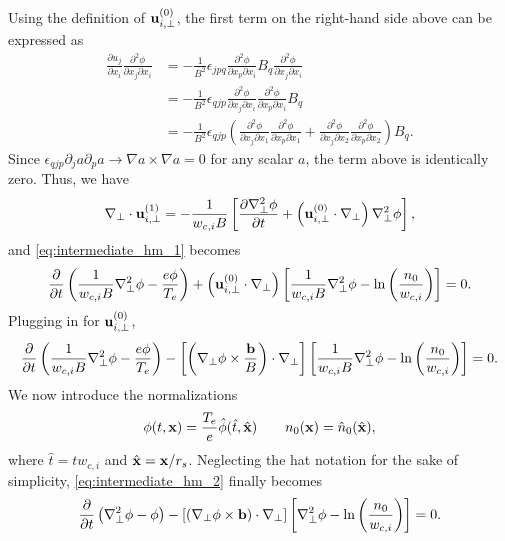 \documentclass[oneside,a4paper,11pt]{report}
\begin{document}
Using the definition of $\mathbf{u}_{i,\perp}^{(0)}$, the first term on the right-hand side above can be expressed as
\begin{align}
    \frac{\partial u_j}{\partial x_i} \frac{\partial^2 \phi}{\partial x_j \partial x_i} &= -\frac{1}{B^2} \epsilon_{jpq} \frac{\partial^2 \phi}{\partial x_p \partial x_i} B_q \frac{\partial^2 \phi}{\partial x_j \partial x_i} \nonumber \\
    &= -\frac{1}{B^2} \epsilon_{qjp} \frac{\partial^2 \phi}{\partial x_j \partial x_i} \frac{\partial^2 \phi}{\partial x_p \partial x_i} B_q  \nonumber \\
    &= -\frac{1}{B^2} \epsilon_{qjp} \left ( \frac{\partial^2 \phi}{\partial x_j \partial x_1} \frac{\partial^2 \phi}{\partial x_p \partial x_1} + \frac{\partial^2 \phi}{\partial x_j \partial x_2} \frac{\partial^2 \phi}{\partial x_p \partial x_2}  \right ) B_q.
\end{align}
Since $\epsilon_{qjp} \partial_j a \partial_p a \to \nabla a \times \nabla a = 0$ for any scalar $a$, the term above is identically zero. Thus, we have
\begin{equation}
    \nabla_\perp \cdot \mathbf{u}_{i,\perp}^{(1)} = -\frac{1}{w_{c,i} B} \left [ \frac{\partial \nabla_\perp^2 \phi}{\partial t} + \left ( \mathbf{u}_{i,\perp}^{(0)} \cdot \nabla_\perp \right ) \nabla_\perp^2 \phi \right ],
\end{equation}
and \cref{eq:intermediate_hm_1} becomes
\begin{equation}
   \frac{\partial}{\partial t}\left ( \frac{1}{w_{c,i} B}\nabla_\perp^2 \phi - \frac{e \phi}{T_e} \right ) + \left (\mathbf{u}_{i,\perp}^{(0)} \cdot \nabla_\perp \right) \left [ \frac{1}{w_{c,i} B} \nabla_\perp^2 \phi - \ln \left( \frac{n_0}{w_{c,i}} \right) \right] = 0.
\end{equation}
Plugging in for $\mathbf{u}_{i,\perp}^{(0)}$,
\begin{equation}
\label{eq:intermediate_hm_2}
   \frac{\partial}{\partial t}\left ( \frac{1}{w_{c,i} B}\nabla_\perp^2 \phi - \frac{e \phi}{T_e} \right ) - \left [ \left( \nabla_\perp \phi \times \frac{\mathbf{b}}{B} \right) \cdot \nabla_\perp \right] \left [ \frac{1}{w_{c,i} B} \nabla_\perp^2 \phi - \ln \left ( \frac{n_0}{w_{c,i}} \right) \right ] = 0.
\end{equation}
We now introduce the normalizations
\begin{equation}
    \phi(t,\mathbf{x}) = \frac{T_e}{e} \hat{\phi}(\hat{t},\hat{\mathbf{x}}) \qquad n_0(\mathbf{x}) = \hat{n}_0(\hat{\mathbf{x}}),
\end{equation}
where $\hat{t} = t w_{c,i}$ and $\hat{\mathbf{x}} = \mathbf{x} / r_s$. Neglecting the hat notation for the sake of simplicity, \cref{eq:intermediate_hm_2} finally becomes
\begin{equation}
    \label{eq:hasegawa_mima}
   \frac{\partial}{\partial t}\left ( \nabla_\perp^2 \phi - \phi \right ) - \left [ \left( \nabla_\perp \phi \times \mathbf{b} \right) \cdot \nabla_\perp \right] \left [ \nabla_\perp^2 \phi - \ln \left( \frac{n_0}{w_{c,i}} \right) \right ] = 0.
\end{equation}
\end{document}
